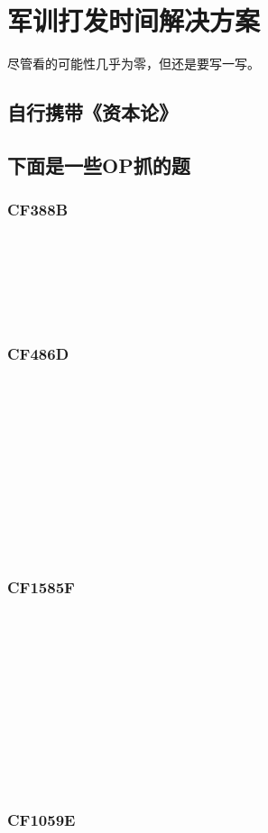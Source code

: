\section{军训打发时间解决方案}

尽管看的可能性几乎为零，但还是要写一写。

\subsection{自行携带《资本论》}

\subsection{下面是一些OP抓的题}

\subsubsection{CF388B}

~\\
~\\
~\\
~\\
~\\
\subsubsection{CF486D}

~\\
~\\
~\\
~\\
~\\
~\\
~\\
~\\
~\\
~\\
\subsubsection{CF1585F}

~\\
~\\
~\\
~\\
~\\
~\\
~\\
~\\
~\\
~\\
\subsubsection{CF1059E}

~\\
~\\
~\\
~\\
~\\
~\\
~\\
~\\
~\\
~\\
